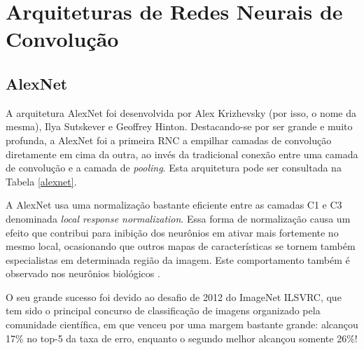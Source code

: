 \section{Arquiteturas de Redes Neurais de Convolução}\label{sec:arc}
\subsection{AlexNet}

A arquitetura AlexNet foi desenvolvida por Alex Krizhevsky (por isso, o nome da mesma), Ilya Sutskever e Geoffrey Hinton. Destacando-se por ser grande e muito profunda, a AlexNet foi a primeira RNC a empilhar camadas de convolução diretamente em cima da outra, ao invés da tradicional conexão entre uma camada de convolução e a camada de \textit{pooling}. Esta arquitetura pode ser consultada na Tabela \ref{alexnet}.

A AlexNet usa uma normalização bastante eficiente entre as camadas C1 e C3 denominada \textit{local response normalization}. Essa forma de normalização causa um efeito que contribui para inibição dos neurônios em ativar mais fortemente no mesmo local, ocasionando que outros mapas de características se tornem também especialistas em determinada região da imagem. Este comportamento também é observado nos neurônios biológicos \citep{geron2017hands}. 

O seu grande sucesso foi devido ao desafio de 2012 do ImageNet ILSVRC, que tem sido o principal concurso de classificação de imagens organizado pela comunidade científica, em que venceu por uma margem bastante grande: alcançou 17\% no top-5 da taxa de erro, enquanto o segundo melhor alcançou somente 26\%!


